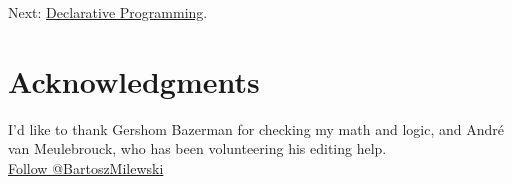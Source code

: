 Next:
\href{https://bartoszmilewski.com/2015/04/15/category-theory-and-declarative-programming/}{Declarative
Programming}.

\section{Acknowledgments}\label{acknowledgments}

I'd like to thank Gershom Bazerman for checking my math and logic, and
André van Meulebrouck, who has been volunteering his editing help.\\
\href{https://twitter.com/BartoszMilewski}{Follow @BartoszMilewski}
